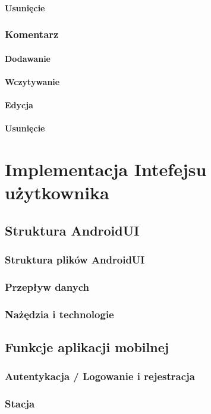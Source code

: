 \paragraph{Usunięcie}
\subsubsection{Komentarz}
\paragraph{Dodawanie}
\paragraph{Wczytywanie}
\paragraph{Edycja}
\paragraph{Usunięcie}
%
\section{Implementacja Intefejsu użytkownika}
\subsection{Struktura AndroidUI}
\subsubsection{Struktura plików AndroidUI}
\subsubsection{Przepływ danych}
\subsubsection{Nażędzia i technologie}
\subsection{Funkcje aplikacji mobilnej}
\subsubsection{Autentykacja / Logowanie i rejestracja}
\subsubsection{Stacja}
